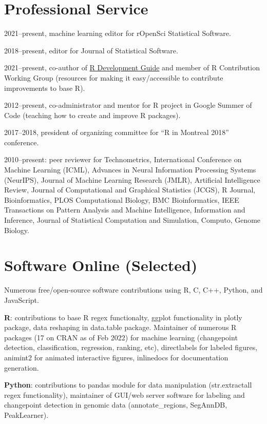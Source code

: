 \documentclass[margin,line]{res}
\begin{document}
\begin{resume}
\section{\sc Professional Service}

2021--present, machine learning editor for rOpenSci Statistical Software.

2018--present, editor for Journal of Statistical Software.

2021--present, co-author of
\href{https://contributor.r-project.org/rdevguide/}{R Development
  Guide} and member of R Contribution Working Group (resources for
making it easy/accessible to contribute improvements to base R).

2012--present, co-administrator and mentor for R project in Google
Summer of Code (teaching how to create and improve R packages).

2017--2018, president of organizing committee for ``R in Montreal
2018'' conference.

2010--present: peer reviewer for Technometrics, International
Conference on Machine Learning (ICML), Advances in Neural Information
Processing Systems (NeurIPS), Journal of Machine Learning Research
(JMLR), Artificial Intelligence Review, Journal of Computational and
Graphical Statistics (JCGS), R Journal, Bioinformatics, PLOS
Computational Biology, BMC Bioinformatics, IEEE Transactions on
Pattern Analysis and Machine Intelligence, Information and Inference,
Journal of Statistical Computation and Simulation, Computo, Genome
Biology.

\section{\sc Software Online (Selected)} 

Numerous free/open-source software contributions using R, C, C++,
Python, and JavaScript.

{\bf R}: contributions to base R regex functionalty, ggplot
functionality in plotly package, data reshaping in data.table
package. Maintainer of numerous R packages (17 on CRAN as of Feb 2022)
for machine learning (changepoint detection, classification,
regression, ranking, etc), directlabels for labeled figures, animint2
for animated interactive figures, inlinedocs for documentation
generation.

{\bf Python}: contributions to pandas module for data manipulation
(str.extractall regex functionality), maintainer of GUI/web server
software for labeling and changepoint detection in genomic data
(annotate\_regions, SegAnnDB, PeakLearner).


\end{resume}
\end{document}

